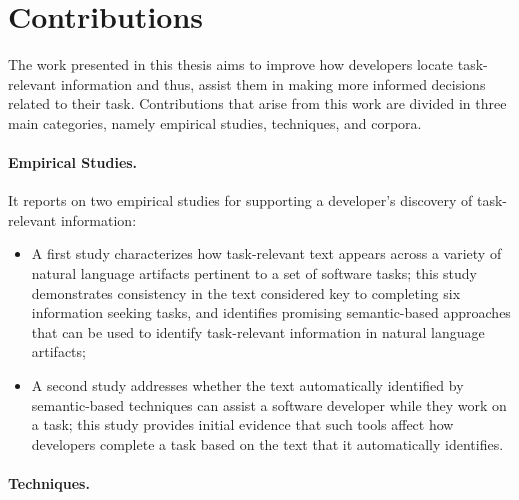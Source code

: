 

\section{Contributions}
\label{cp1:contributions}


The work presented in this thesis 
aims to improve how developers locate task-relevant information and thus, assist them in making more informed decisions related to their task.
Contributions that arise from this work are divided in three main categories, namely 
empirical studies, techniques, and corpora.




\paragraph{\textbf{Empirical Studies.}} 

It reports on two empirical studies for supporting a developer's discovery of task-relevant information:

\begin{itemize}

    \item A first study characterizes how task-relevant text appears across a variety of natural language artifacts pertinent to a set of software tasks; this study demonstrates consistency in the text 
    considered key to completing six information seeking tasks, and identifies 
    promising semantic-based approaches that can be used to identify task-relevant information in natural language artifacts; 

    \item A second study addresses whether 
    the text automatically identified by semantic-based techniques can assist a software developer while they work on a task; this study provides initial evidence that such tools affect how developers complete a task 
    based on the text that it automatically identifies.
\end{itemize}




\paragraph{\textbf{Techniques.}} 

